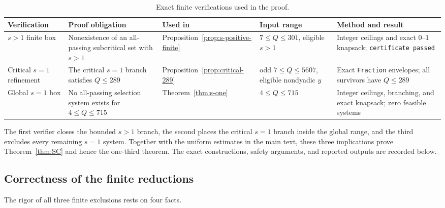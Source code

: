 \documentclass[11pt]{article}
\theoremstyle{definition}
\theoremstyle{remark}
\begin{document}
\begin{table}[ht]

\centering
\footnotesize
\begin{tabularx}{\textwidth}{@{}
>{\raggedright\arraybackslash}p{}
>{\raggedright\arraybackslash}p{}
>{\raggedright\arraybackslash}p{}
>{\raggedright\arraybackslash}p{}X@{}}
\toprule
Verification & Proof obligation & Used in & Input range & Method and result \\
\midrule
\(s>1\) finite box &
Nonexistence of an all-passing subcritical set with \(s>1\) &
Proposition~\ref{prop:s-positive-finite} &
\(7\le Q\le301\), eligible \(s>1\) &
Integer ceilings and exact \(0\)--\(1\) knapsack; \texttt{certificate passed} \\
Critical \(s=1\) refinement &
The critical \(s=1\) branch satisfies \(Q\le289\) &
Proposition~\ref{prop:critical-289} &
odd \(7\le Q\le5607\), eligible nondyadic \(y\) &
Exact \texttt{Fraction} envelopes; all survivors have \(Q\le289\) \\
Global \(s=1\) box &
No all-passing selection system exists for \(4\le Q\le715\) &
Theorem~\ref{thm:s-one} &
\(4\le Q\le715\) &
Integer ceilings, branching, and exact knapsack; zero feasible systems \\
\bottomrule
\end{tabularx}
\caption{Exact finite verifications used in the proof.}
\label{tab:contracts}
\end{table}

The first verifier closes the bounded \(s>1\) branch, the second places the
critical \(s=1\) branch inside the global range, and the third excludes every
remaining \(s=1\) system.  Together with the uniform estimates in the main
text, these three implications prove Theorem~\ref{thm:SC} and hence the
one-third theorem.  The exact constructions, safety arguments, and reported
outputs are recorded below.

\subsection{Correctness of the finite reductions}

The rigor of all three finite exclusions rests on four facts.
\end{document}

